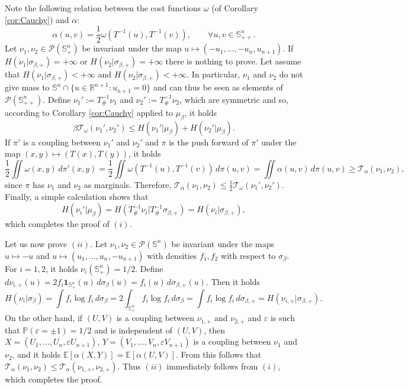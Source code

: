 \documentclass[10pt]{amsart}
\theoremstyle{definition}
\theoremstyle{remark}
\newcommand{\R}{\mathbb{R}}
\renewcommand{\P}{\mathbb{P}}
\newcommand{\E}{\mathbb{E}}
\newcommand{\Sd}{\mathbb{S}}
\begin{document}
Note the following relation between the cost functions $\omega$ (of Corollary \ref{cor:Cauchy}) and $\alpha$:
\[
\alpha(u,v) = \frac{1}{2}\omega(T^{-1}(u),T^{-1}(v)),\qquad \forall u,v \in \Sd^n_{++}.
\]
Let $\nu_1,\nu_2 \in \mathcal{P}(\Sd^n_{+})$ be invariant under the map $u \mapsto (-u_1,\ldots,-u_n,u_{n+1})$. If $H(\nu_1|\sigma_{\beta,+})=+\infty$ or $H(\nu_2|\sigma_{\beta,+})=+\infty$ there is nothing to prove. Let assume that $H(\nu_1|\sigma_{\beta,+})<+\infty$ and $H(\nu_2|\sigma_{\beta,+})<+\infty$. In particular, $\nu_1$ and $\nu_2$ do not give mass to $\Sd^n \cap \{u \in \R^{n+1} : u_{n+1}=0\}$ and can thus be seen as elements of $\mathcal{P}(\Sd^n_{++})$. Define $\nu_1':=T^{-1}_\#\nu_1$ and $\nu_2' :=T^{-1}_\#\nu_2$, which are symmetric and so, according to Corollary \ref{cor:Cauchy} applied to $\mu_\beta$, it holds
\[
\beta\mathcal{T}_{\omega}(\nu_1',\nu_2') \leq H(\nu_1' | \mu_\beta) + H(\nu_2' | \mu_\beta).
\]
If $\pi'$ is a coupling between $\nu_1'$ and $\nu_2'$ and $\pi$ is the push forward of $\pi'$ under the map $(x,y) \mapsto (T(x),T(y))$, it holds
\[
\frac{1}{2}\iint \omega(x,y)\,d\pi'(x,y) =\frac{1}{2}\iint \omega(T^{-1}(u),T^{-1}(v))\,d\pi(u,v) = \iint \alpha(u,v)\,d\pi(u,v) \geq \mathcal{T}_\alpha(\nu_1,\nu_2),
\]
since $\pi$ has  $\nu_1$ and $\nu_2$ as marginals. Therefore, $\mathcal{T}_\alpha(\nu_1,\nu_2) \leq \frac{1}{2}\mathcal{T}_{\omega}(\nu_1',\nu_2')$. Finally, a simple calculation shows that
\[
H(\nu_i' | \mu_\beta) = H(T^{-1}_\#\nu_i | T^{-1}_\#\sigma_{\beta,+}) = H(\nu_i | \sigma_{\beta,+}),
\]
which completes the proof of $(i)$.

Let us now prove $(ii)$. Let $\nu_1,\nu_2 \in \mathcal{P}(\Sd^n)$ be invariant under the maps $u\mapsto -u$ and $u\mapsto (u_1,\ldots,u_{n},-u_{n+1})$ with densities $f_1,f_2$ with respect to $\sigma_\beta$.
For $i=1,2$, it holds $\nu_i(\Sd^n_+)=1/2$. Define $d\nu_{i,+}(u) = 2f_i \mathbf{1}_{\Sd^n_+}(u)\,d\sigma_\beta(u)=f_i(u)\,d\sigma_{\beta,+}(u)$. Then it holds
\[
H(\nu_i|\sigma_\beta) = \int f_i \log f_i \,d\sigma_\beta = 2 \int_{\Sd^n_+} f_i \log f_i \,d\sigma_\beta = \int f_i \log f_i \,d\sigma_{\beta,+} = H(\nu_{i,+}|\sigma_{\beta,+}).
\]
On the other hand, if $(U,V)$ is a coupling between $\nu_{1,+}$ and $\nu_{2,+}$ and $\varepsilon$ is such that $\P(\varepsilon = \pm 1) =1/2$ and is independent of $(U,V)$, then $X=(U_1,\ldots,U_n,\varepsilon U_{n+1})$, $Y=(V_1,\ldots,V_n,\varepsilon V_{n+1})$ is a coupling between $\nu_1$ and $\nu_2$, and it holds $\E[\alpha(X,Y)] = \E[\alpha(U,V)]$. From this follows that $\mathcal{T}_\alpha(\nu_1,\nu_2) \leq \mathcal{T}_\alpha(\nu_{1,+},\nu_{2,+}).$ Thus $(ii)$ immediately follows from $(i)$, which completes the proof.
\endproof
\end{document}
